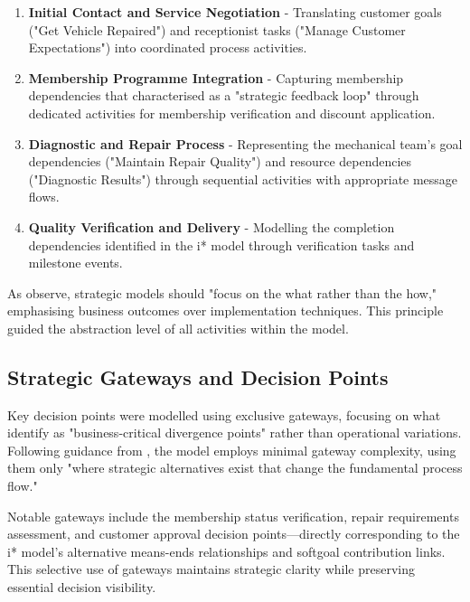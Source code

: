 \documentclass[14pt,a4paper]{article}
\begin{document}
\begin{enumerate}
    \item \textbf{Initial Contact and Service Negotiation} - Translating customer goals ("Get Vehicle Repaired") and receptionist tasks ("Manage Customer Expectations") into coordinated process activities.

    \item \textbf{Membership Programme Integration} - Capturing membership dependencies that \textit{\parencite[p. 263]{Castro2018}} characterised as a "strategic feedback loop" through dedicated activities for membership verification and discount application.

    \item \textbf{Diagnostic and Repair Process} - Representing the mechanical team's goal dependencies ("Maintain Repair Quality") and resource dependencies ("Diagnostic Results") through sequential activities with appropriate message flows.

    \item \textbf{Quality Verification and Delivery} - Modelling the completion dependencies identified in the i* model through verification tasks and milestone events.
\end{enumerate}

As \textit{\parencite[p. 158]{Koschmider2019}} observe, strategic models should "focus on the what rather than the how," emphasising business outcomes over implementation techniques. This principle guided the abstraction level of all activities within the model.

\subsection{Strategic Gateways and Decision Points}

Key decision points were modelled using exclusive gateways, focusing on what \textit{\parencite[p. 185]{Allweyer2016}} identify as "business-critical divergence points" rather than operational variations. Following guidance from \textit{\parencite[p. 42]{Bocciarelli2017}}, the model employs minimal gateway complexity, using them only "where strategic alternatives exist that change the fundamental process flow."

Notable gateways include the membership status verification, repair requirements assessment, and customer approval decision points—directly corresponding to the i* model's alternative means-ends relationships and softgoal contribution links. This selective use of gateways maintains strategic clarity while preserving essential decision visibility.
\end{document}
